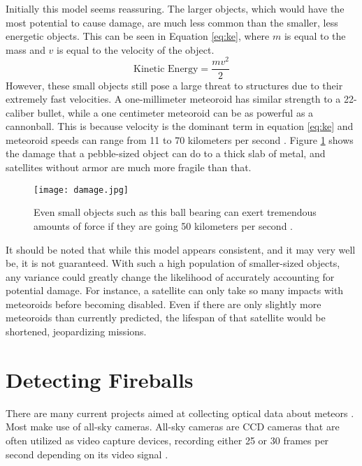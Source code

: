 Initially this model seems reassuring. The larger objects, which would have the most  potential to cause damage, are much less common than the smaller, less energetic objects. This can be seen in Equation \ref{eq:ke}, where $m$ is equal to the mass and $v$ is equal to the velocity of the object.
\begin{equation} \label{eq:ke}
	\textrm{Kinetic Energy} = \frac{mv^2}{2}
\end{equation}
However, these small objects still pose a large threat to structures due to their extremely fast velocities. A one-millimeter meteoroid has similar strength to a 22-caliber bullet, while a one centimeter meteoroid can be as powerful as a cannonball. This is because velocity is the dominant term in equation \ref{eq:ke} and meteoroid speeds can range from 11 to 70 kilometers per second \cite{Harbaugh2008}. Figure \ref{fig:damage} shows the damage that a pebble-sized object can do to a thick slab of metal, and satellites without armor are much more fragile than that.

\begin{figure}[ht!]
  \centering
  \texttt{[image: damage.jpg]}
  \caption{Even small objects such as this ball bearing can exert tremendous amounts of force if they are going 50 kilometers per second \protect\cite{ESA2017}.}
  \label{fig:damage}
\end{figure}


It should be noted that while this model appears consistent, and it may very well be, it is not guaranteed. With such a high population of smaller-sized objects, any variance could greatly change the likelihood of accurately accounting for potential damage. For instance, a satellite can only take so many impacts with meteoroids before becoming disabled. Even if there are only slightly more meteoroids than currently predicted, the lifespan of that satellite would be shortened, jeopardizing missions. 



\section{Detecting Fireballs}
There are many current projects aimed at collecting optical data about meteors \cite{Jenniskens2011,Trigo-Rodriguez2007,Halliday1996}. Most make use of all-sky cameras. All-sky cameras are CCD cameras that are often utilized as video capture devices, recording either 25 or 30 frames per second depending on its video signal \cite{Molau2005}.

